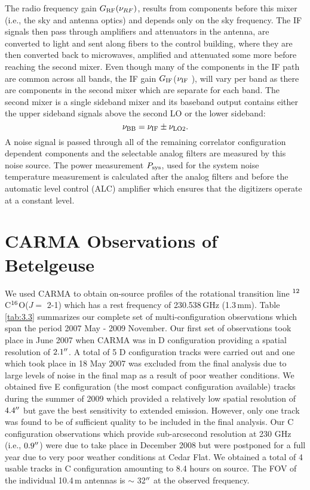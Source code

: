 The radio frequency gain $G_{\rm{RF}}(\nu _{RF})$, results from components before this mixer (i.e., the sky and antenna optics) and depends only on the sky frequency. The IF signals then pass through amplifiers and attenuators in the antenna, are converted to light and sent along fibers to the control building, where they are then converted back to microwaves, amplified and attenuated some more before reaching the second mixer. Even though many of the components in the IF path are common across all bands, the IF gain $G_{\rm{IF}}$($\nu _{\rm{IF}}$ ), will vary per band as there are components in the second mixer which are separate for each band. The second mixer is a single sideband mixer and its baseband output contains either the upper sideband signals above the second LO or the lower sideband:
\begin{equation}
\nu _{\rm{BB}} = \nu _{\rm{IF}} \pm \nu _{\rm{LO2}}.
\end{equation}
A noise signal is passed through all of the remaining correlator configuration dependent components and the selectable analog filters are measured by this noise source. The power measurement $P_{\rm{sys}}$, used for the system noise temperature measurement is calculated after the analog filters and before the automatic level control (ALC) amplifier which ensures that the digitizers operate at a constant level.

\section{CARMA Observations of Betelgeuse}\label{sec:3.3}
We used CARMA to obtain on-source profiles of the rotational transition line $\rm{{}^{12}}$C$\rm{{}^{16}}$O($J=$ 2-1) which has a rest frequency of 230.538\,GHz (1.3\,mm). Table \ref{tab:3.3} summarizes our complete set of multi-configuration observations which span the period 2007 May - 2009 November. Our first set of observations took place in June 2007 when CARMA was in D configuration providing a spatial resolution of $2.1^{\prime\prime}$. A total of 5 D configuration tracks were carried out and one which took place in 18 May 2007 was excluded from the final analysis due to large levels of noise in the final map as a result of poor weather conditions. We obtained five E configuration (the most compact configuration available) tracks during the summer of 2009  which provided a relatively low spatial resolution of $4.4^{\prime\prime}$ but gave the best sensitivity to extended emission. However, only one track was found to be of sufficient quality to be included in the final analysis. Our C configuration observations which provide sub-arcsecond resolution at 230 GHz (i.e., $0.9^{\prime\prime}$) were due to take place in December 2008 but were postponed for a full year due to very poor weather conditions at  Cedar Flat. We obtained a total of 4 usable tracks in C configuration amounting to 8.4 hours on source. The FOV of the individual 10.4\,m antennas is $\sim$ 32$^{\prime\prime}$ at the observed frequency.

